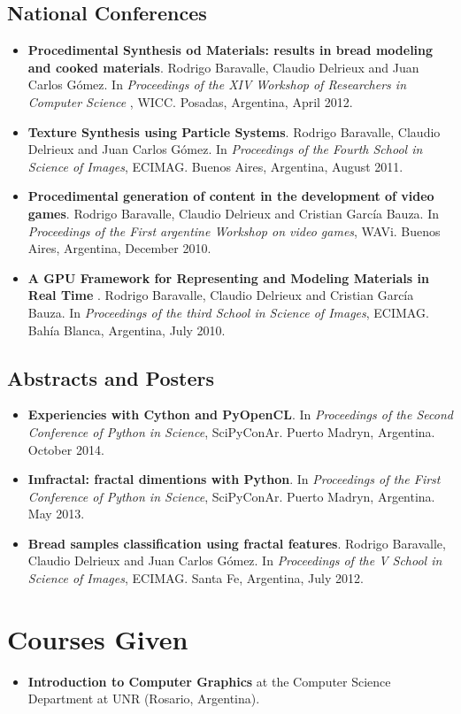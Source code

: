 \documentclass[a4paper,12pt]{article}
\begin{document}
\subsection*{National Conferences}
\begin{itemize}
\item {\bf Procedimental Synthesis od Materials: results in bread modeling and cooked materials}. Rodrigo Baravalle, Claudio Delrieux and Juan Carlos G\'omez. In {\it Proceedings of the XIV Workshop of Researchers in Computer Science }, WICC. Posadas, Argentina, April 2012.
\item {\bf Texture Synthesis using Particle Systems}. Rodrigo Baravalle, Claudio Delrieux and Juan Carlos G\'omez. In {\it Proceedings of the Fourth School in Science of Images}, ECIMAG. Buenos Aires, Argentina, August 2011.
\item {\bf Procedimental generation of content in the development of video games}. Rodrigo Baravalle, Claudio Delrieux and Cristian Garc\'ia Bauza. In {\it Proceedings of the First argentine Workshop on video games}, WAVi. Buenos Aires, Argentina, December 2010.
\item {\bf A GPU Framework for Representing and Modeling Materials in Real Time }. Rodrigo Baravalle, Claudio Delrieux and Cristian Garc\'ia Bauza. In {\it Proceedings of the third School in Science of Images}, ECIMAG. Bahía Blanca, Argentina, July 2010.
\end{itemize}

\subsection*{Abstracts and Posters}
\begin{itemize}
\item {\bf Experiencies with Cython and PyOpenCL}. In {\it Proceedings of the Second Conference of Python in Science}, SciPyConAr. Puerto Madryn, Argentina. October 2014.
\item {\bf Imfractal: fractal dimentions with Python}.  In {\it Proceedings of the First Conference of Python in Science}, SciPyConAr. Puerto Madryn, Argentina. May 2013.
\item {\bf Bread samples classification using fractal features}. Rodrigo Baravalle, Claudio Delrieux and Juan Carlos G\'omez. In {\it Proceedings of the V School in Science of Images}, ECIMAG. Santa Fe, Argentina, July 2012.
\end{itemize}


\section*{Courses Given}
\begin{itemize}
\item {\bf Introduction to Computer Graphics} at the Computer Science Department at UNR (Rosario, Argentina).
\end{itemize}
\end{document}
